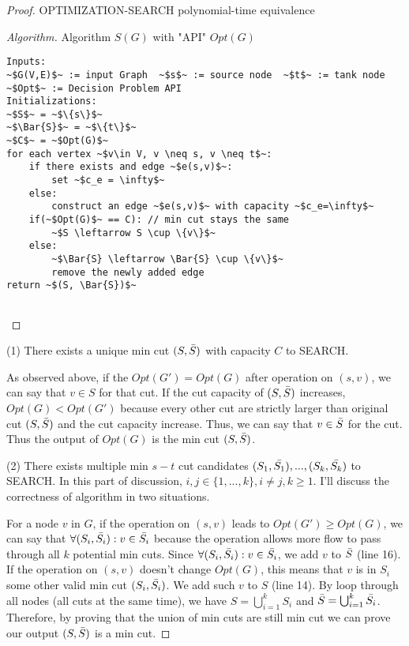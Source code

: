 \documentclass[openany]{article}
\begin{document}
\begin{proof}{}{OPTIMIZATION-SEARCH polynomial-time equivalence}
\begin{proof}[Algorithm]{}
		\renewcommand{\qedsymbol}{}
		Algorithm $S(G)$ with "API" $Opt(G)$
		\begin{lstlisting}[basicstyle=\fontsize{8}{9}\selectfont\ttfamily]
Inputs:
~$G(V,E)$~ := input Graph  ~$s$~ := source node  ~$t$~ := tank node
~$Opt$~ := Decision Problem API
Initializations:
~$S$~ = ~$\{s\}$~
~$\Bar{S}$~ = ~$\{t\}$~
~$C$~ = ~$Opt(G)$~
for each vertex ~$v\in V, v \neq s, v \neq t$~:
    if there exists and edge ~$e(s,v)$~:
        set ~$c_e = \infty$~
    else:
        construct an edge ~$e(s,v)$~ with capacity ~$c_e=\infty$~
    if(~$Opt(G)$~ == C): // min cut stays the same
        ~$S \leftarrow S \cup \{v\}$~
    else:
        ~$\Bar{S} \leftarrow \Bar{S} \cup \{v\}$~
        remove the newly added edge
return ~$(S, \Bar{S})$~
    
		\end{lstlisting} 
\end{proof}




(1) There exists a unique min cut $(S,\Bar{S})$ with capacity $C$ to SEARCH.

\qquad As observed above, if the $Opt(G')=Opt(G)$ after operation on $(s,v)$, we can say that $v\in S$ for that cut. If the cut capacity of $(S,\Bar{S})$ increases, $Opt(G) < Opt(G')$ because every other cut are strictly larger than original cut $(S,\Bar{S})$ and the cut capacity increase. Thus, we can say that $v \in \Bar{S}$ for the cut. Thus the output of $Opt(G)$ is the min cut $(S,\Bar{S})$.

(2) There exists multiple min $s-t$ cut candidates $(S_1,\Bar{S_1}), ... , (S_k,\Bar{S_k})$ to SEARCH. In this part of discussion, $i,j \in \{1,...,k\}, i\neq j, k \geqslant 1$. I'll discuss the correctness of algorithm in two situations.

\qquad For a node $v$ in $G$, if the operation on $(s,v)$ leads to $Opt(G') \geqslant Opt(G)$, we can say that $\forall (S_i, \Bar{S_i}): v \in \Bar{S_i}$ because the operation allows more flow to pass through all $k$ potential min cuts. Since $\forall (S_i, \Bar{S_i}): v\in \Bar{S_i}$, we add $v$ to $\Bar{S}$ (line 16). If the operation on $(s,v)$ doesn't change $Opt(G)$, this means that $v$ is in $S_i$ some other valid min cut $(S_i,\Bar{S_i})$. We add such $v$ to $S$ (line 14). By loop through all nodes (all cuts at the same time), we have $S = \bigcup_{i=1}^{k}S_i$ and $\Bar{S} = \bigcup_{i=1}^{k}\Bar{S_i}$. Therefore, by proving that the union of min cuts are still min cut we can prove our output $(S,\Bar{S})$ is a min cut.


\end{proof}
\end{document}

